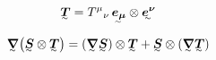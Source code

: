 \documentclass{article}
\begin{document}
\begin{align}
	\ts T = T^\mu{}_\nu \, \ts{e_\mu} \otimes \ts{e^\nu}
\end{align}

\begin{align}
	\ts\nabla\qty(\ts S \otimes \ts T) = (\ts\nabla\ts S)\otimes \ts T + \ts S \otimes (\ts\nabla\ts T)
\end{align}
\end{document}
